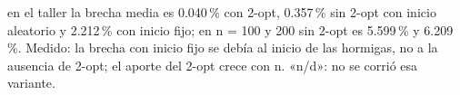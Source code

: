 {en el taller la brecha media es 0.040\,\% con 2-opt, 0.357\,\% sin 2-opt con inicio aleatorio y 2.212\,\% con inicio fijo; en n = 100 y 200 sin 2-opt es 5.599\,\% y 6.209\,\%.}
{Medido: la brecha con inicio fijo se debía al inicio de las hormigas, no a la ausencia de 2-opt; el aporte del 2-opt crece con n. «n/d»: no se corrió esa variante.}
